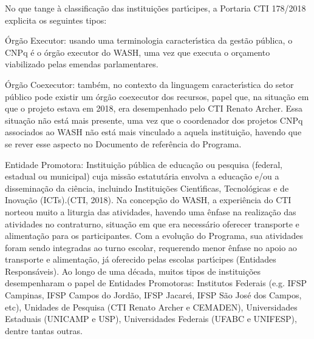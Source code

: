 \documentclass[
12pt,		%
openright,	%
twoside,  %
a4paper,			%
chapter=TITLE,		%
english,			%
french,				%
spanish,			%
brazil				%
]{USPSC-classe/USPSC}
\begin{document}
No que tange \`a classifica\c{c}\~ao das institui\c{c}\~oes part\'{\i}cipes, a Portaria CTI 178/2018 explicita os seguintes tipos:


















\begin{alineas}
\item \'Org\~ao Executor: usando uma terminologia caracter\'{\i}stica da gest\~ao p\'ublica, o CNPq \'e o \'org\~ao executor do WASH, uma vez que executa o or\c{c}amento viabilizado pelas emendas parlamentares.
\item \'Org\~ao Coexecutor: tamb\'em, no contexto da linguagem caracter\'{\i}stica do setor p\'ublico pode existir um \'org\~ao coexecutor dos recursos, papel que, na situa\c{c}\~ao em que o projeto estava em 2018, era desempenhado pelo CTI Renato Archer. Essa situa\c{c}\~ao n\~ao est\'a mais presente, uma vez que o coordenador dos projetos CNPq associados ao WASH n\~ao est\'a mais vinculado a aquela institui\c{c}\~ao, havendo que se rever esse aspecto no Documento de refer\^encia do Programa.
\item Entidade Promotora: \textquotedbl Institui\c{c}\~ao p\'ublica de educa\c{c}\~ao ou pesquisa (federal, estadual ou municipal) cuja miss\~ao estatut\'aria envolva a educa\c{c}\~ao e/ou a dissemina\c{c}\~ao da ci\^encia, incluindo Institui\c{c}\~oes Cient\'{\i}ficas, Tecnol\'ogicas e de Inova\c{c}\~ao (ICTs).\textquotedbl  (CTI, 2018). Na concep\c{c}\~ao do WASH, a experi\^encia do CTI norteou muito a \textquotedbl  liturgia \textquotedbl  das atividades, havendo uma \^enfase na realiza\c{c}\~ao das atividades no contraturno, situa\c{c}\~ao em que era necess\'ario oferecer transporte e alimenta\c{c}\~ao para os participantes. Com a evolu\c{c}\~ao do Programa, sua atividades foram sendo integradas ao turno escolar, requerendo menor \^enfase no apoio ao transporte e alimenta\c{c}\~ao, j\'a oferecido pelas escolas part\'{\i}cipes (Entidades Respons\'aveis). Ao longo de uma d\'ecada, muitos tipos de institui\c{c}\~oes desempenharam o papel de Entidades Promotoras: Institutos Federais (e.g. IFSP Campinas, IFSP Campos do Jord\~ao, IFSP Jacare\'{\i}, IFSP S\~ao Jos\'e dos Campos, etc), Unidades de Pesquisa (CTI Renato Archer e CEMADEN), Universidades Estaduais (UNICAMP e USP), Universidades Federais (UFABC e UNIFESP), dentre tantas outras.

\end{alineas}
\end{document}
